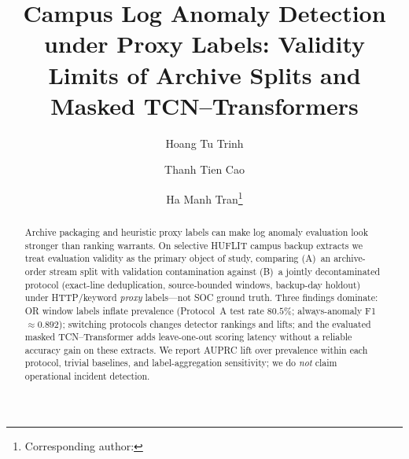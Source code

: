 \documentclass[a4paper]{llncs}
\begin{document}
\title{Campus Log Anomaly Detection under Proxy Labels: Validity Limits of Archive Splits and Masked TCN--Transformers}


\author{Hoang Tu Trinh \and
Thanh Tien Cao \and
Ha Manh Tran\thanks{Corresponding author: }}



\maketitle
\thispagestyle{empty}

\begin{abstract}
Archive packaging and heuristic proxy labels can make log anomaly evaluation look stronger than ranking warrants.
On selective HUFLIT campus backup extracts we treat evaluation validity as the primary object of study, comparing
(A)~an archive\nobreakdash-order stream split with validation contamination against
(B)~a jointly decontaminated protocol (exact\nobreakdash-line deduplication, source\nobreakdash-bounded windows, backup\nobreakdash-day holdout) under HTTP/keyword \emph{proxy} labels---not SOC ground truth.
Three findings dominate: OR window labels inflate prevalence (Protocol~A test rate $80.5\%$; always\nobreakdash-anomaly F1${\approx}0.892$);
switching protocols changes detector rankings and lifts; and the evaluated masked TCN--Transformer adds leave\nobreakdash-one\nobreakdash-out scoring latency without a reliable accuracy gain on these extracts.
We report AUPRC lift over prevalence within each protocol, trivial baselines, and label\nobreakdash-aggregation sensitivity; we do \emph{not} claim operational incident detection.
\end{abstract}
\end{document}
